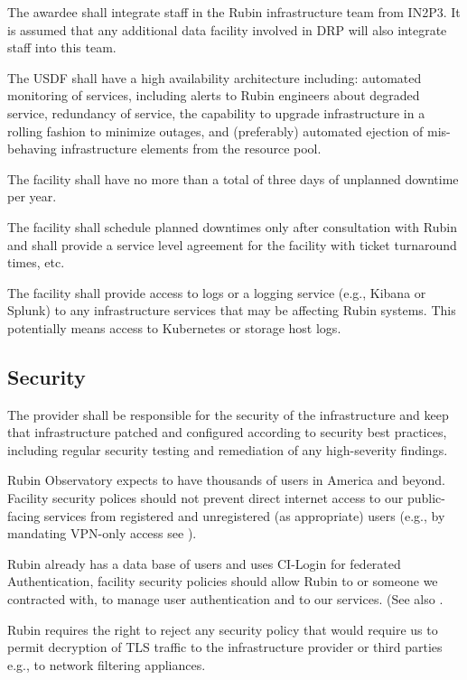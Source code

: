 \reqsimp{}{}{}{}{} { The awardee shall integrate staff in the Rubin
  infrastructure team from \gls{IN2P3}. It is assumed that any
  additional data facility involved in \gls{DRP} will also integrate
  staff into this team. }

\reqsimp{}{}{}{}{}{}
{
The USDF shall have a high availability architecture including: automated monitoring of services, including alerts to Rubin engineers about degraded service,   redundancy of service,
the capability to upgrade infrastructure in a rolling fashion to minimize outages, and (preferably) automated ejection of mis-behaving infrastructure elements from the resource pool.
}

\reqsimp{}{}{}{}{} {The facility shall have no more than a total of three days of
unplanned downtime per year. }

\reqsimp{}{}{}{}{} { The facility shall schedule planned downtimes only after consultation with Rubin
and shall provide a service level agreement for the facility with ticket turnaround
times, etc.}

\reqsimp{}{}{}{}{}{}
{The facility  shall provide access to logs or a logging service (e.g., Kibana or Splunk) to any infrastructure services that may be affecting Rubin systems. This potentially means access to Kubernetes or storage host logs. \label{req:logs}}


\subsection{Security} \label{sec:sec}
The provider shall be responsible for the security of the infrastructure and keep that infrastructure patched and configured according to security best practices, including regular security testing and remediation of any high-severity findings.

Rubin Observatory  expects to have thousands of users in America and beyond. Facility security polices should not prevent direct internet access to our public-facing services from registered and unregistered (as appropriate) users (e.g., by mandating VPN-only access see ).

Rubin already has a data base of users and uses CI-Login for federated Authentication, facility security policies should allow Rubin to or someone we contracted with, to manage user authentication and to our services. (See also .

Rubin requires the right to reject any security policy that would require us to permit decryption of TLS traffic to the infrastructure provider or third parties e.g., to network filtering appliances.


